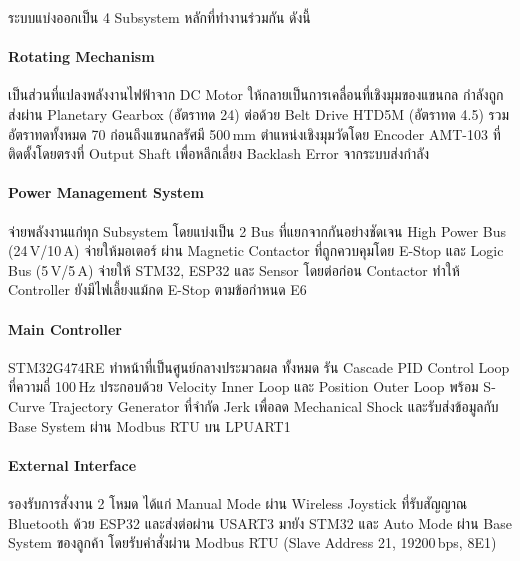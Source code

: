 ระบบแบ่งออกเป็น 4 Subsystem หลักที่ทำงานร่วมกัน
ดังนี้

\paragraph{Rotating Mechanism}
เป็นส่วนที่แปลงพลังงานไฟฟ้าจาก DC Motor
ให้กลายเป็นการเคลื่อนที่เชิงมุมของแขนกล
กำลังถูกส่งผ่าน Planetary Gearbox (อัตราทด 24)
ต่อด้วย Belt Drive HTD5M (อัตราทด 4.5)
รวมอัตราทดทั้งหมด 70 ก่อนถึงแขนกลรัศมี 500\,mm
ตำแหน่งเชิงมุมวัดโดย Encoder AMT-103
ที่ติดตั้งโดยตรงที่ Output Shaft
เพื่อหลีกเลี่ยง Backlash Error จากระบบส่งกำลัง

\paragraph{Power Management System}
จ่ายพลังงานแก่ทุก Subsystem โดยแบ่งเป็น 2 Bus
ที่แยกจากกันอย่างชัดเจน
High Power Bus (24\,V/10\,A) จ่ายให้มอเตอร์
ผ่าน Magnetic Contactor ที่ถูกควบคุมโดย E-Stop
และ Logic Bus (5\,V/5\,A) จ่ายให้ STM32,
ESP32 และ Sensor โดยต่อก่อน Contactor
ทำให้ Controller ยังมีไฟเลี้ยงแม้กด E-Stop
ตามข้อกำหนด E6

\paragraph{Main Controller}
STM32G474RE ทำหน้าที่เป็นศูนย์กลางประมวลผล
ทั้งหมด รัน Cascade PID Control Loop
ที่ความถี่ 100\,Hz ประกอบด้วย Velocity Inner Loop
และ Position Outer Loop
พร้อม S-Curve Trajectory Generator
ที่จำกัด Jerk เพื่อลด Mechanical Shock
และรับส่งข้อมูลกับ Base System
ผ่าน Modbus RTU บน LPUART1

\paragraph{External Interface}
รองรับการสั่งงาน 2 โหมด ได้แก่
Manual Mode ผ่าน Wireless Joystick
ที่รับสัญญาณ Bluetooth ด้วย ESP32
และส่งต่อผ่าน USART3 มายัง STM32
และ Auto Mode ผ่าน Base System ของลูกค้า
โดยรับคำสั่งผ่าน Modbus RTU
(Slave Address 21, 19200\,bps, 8E1)

